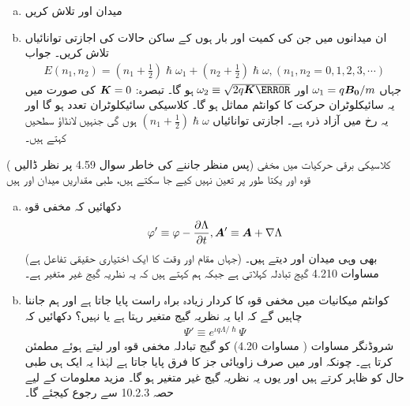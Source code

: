 \begin{enumerate}[a.]
\item  میدان  اور  تلاش کریں 
\item ان میدانوں میں جن کی کمیت  اور بار  ہوں کے ساکن حالات کی اجازتی توانائیاں تلاش کریں۔ جواب
\begin{align}
    E(n_1,n_2)=(n_1+\frac{1}{2})\hslash\omega_1+(n_2+\frac{1}{2})\hslash\omega,       (n_1,n_2=0,1,2,3,\cdots)
\end{align}
جہاں \(\omega_1=q{{\boldsymbol{B_0}}}/m\) اور   \( \omega_2\equiv\sqrt{2q\kvec{K}\m}  \) ہو گا۔ تبصرہ: \( {{\boldsymbol{K}}} = 0 \) کی صورت میں یہ سائیکلوٹران حرکت کا کوانٹم مماثل ہو گا۔ کلاسیکی سائیکلوٹران تعدد  ہو گا اور یہ  رخ میں آزاد ذرہ ہے۔ اجازتی توانائیاں \((n_1+\frac{1}{2})\hslash\omega\) ہوں گی جنہیں لانڈاؤ سطحیں کہتے ہیں۔
\end{enumerate}
( پس منظر جاننے کی خاطر سوال 4.59 پر نظر ڈالیں) کلاسیکی برقی حرکیات میں مخفی قوہ  اور  یکتا طور پر تعین نہیں کیے جا سکتے ہیں، طبی مقداریں میدان  اور  ہیں 
\begin{enumerate}[a.]
\item  دکھائیں کہ مخفی قوہ 
\begin{align}
    \varphi'\equiv\varphi-\frac{\partial\Lambda}{\partial t},  {{\boldsymbol{A}}}' \equiv{\ensuremath{{\boldsymbol{A}}}}+\nabla\Lambda
\end{align}
(جہاں مقام اور وقت کا  ایک اختیاری حقیقی تفاعل ہے) بھی وہی میدان  اور  دیتے ہیں۔ مساوات 4.210 گیج تبادلہ کہلاتی ہے جبکہ ہم کہتے ہیں کہ یہ نظریہ گیج غیر متغیر ہے۔
\item کوانٹم میکانیات میں مخفی قوہ کا کردار زیادہ براہ راست پایا جاتا ہے اور ہم جاننا چاہیں گے کہ ایا یہ نظریہ گیج متغیر رہتا ہے یا نہیں؟ دکھائیں کہ 
\begin{align}
    \Psi'\equiv e^{\iota q \Lambda/\hslash}\Psi
\end{align}
شروڈنگر مساوات ( مساوات 4.20) کو گیج تبادلہ مخفی قوہ   اور  لیتے ہوئے مطمئن کرتا ہے۔ چونکہ  اور  میں صرف زاویائی جز کا فرق پایا جاتا ہے لہٰذا یہ ایک ہی طبی حال کو ظاہر کرتے ہیں اور یوں یہ نظریہ گیج غیر متغیر ہو گا۔ مزید معلومات کے لیے حصہ 10.2.3 سے رجوع کیجئے گا۔
\end{enumerate}

